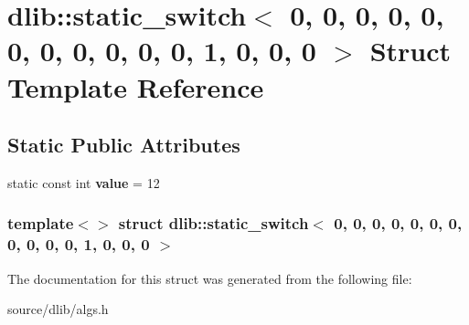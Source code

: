 \hypertarget{structdlib_1_1static__switch_3_010_00_010_00_010_00_010_00_010_00_010_00_010_00_010_00_010_00_0147e6a475a446e40bfc581407a8174f9f}{
\section{dlib::static\_\-switch$<$ 0, 0, 0, 0, 0, 0, 0, 0, 0, 0, 0, 1, 0, 0, 0 $>$ Struct Template Reference}
\label{structdlib_1_1static__switch_3_010_00_010_00_010_00_010_00_010_00_010_00_010_00_010_00_010_00_0147e6a475a446e40bfc581407a8174f9f}
}
\subsection*{Static Public Attributes}
\begin{DoxyCompactItemize}
\item 
\hypertarget{structdlib_1_1static__switch_3_010_00_010_00_010_00_010_00_010_00_010_00_010_00_010_00_010_00_0147e6a475a446e40bfc581407a8174f9f_a6d9fe6baa2a0bce3e63e8e05806d9837}{
static const int {\bfseries value} = 12}
\label{structdlib_1_1static__switch_3_010_00_010_00_010_00_010_00_010_00_010_00_010_00_010_00_010_00_0147e6a475a446e40bfc581407a8174f9f_a6d9fe6baa2a0bce3e63e8e05806d9837}

\end{DoxyCompactItemize}
\subsubsection*{template$<$$>$ struct dlib::static\_\-switch$<$ 0, 0, 0, 0, 0, 0, 0, 0, 0, 0, 0, 1, 0, 0, 0 $>$}



The documentation for this struct was generated from the following file:\begin{DoxyCompactItemize}
\item 
source/dlib/algs.h\end{DoxyCompactItemize}
